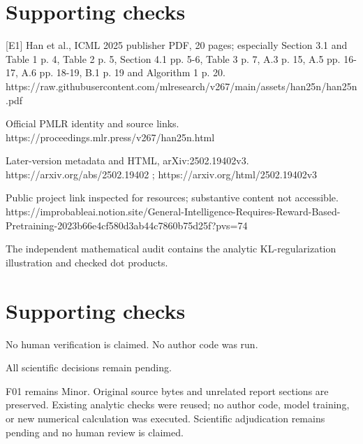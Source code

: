 \documentclass[10pt]{article}
\begin{document}
\section*{Supporting checks}
[E1] Han et al., ICML 2025 publisher PDF, 20 pages; especially Section 3.1 and Table 1 p. 4, Table 2 p. 5, Section 4.1 pp. 5-6, Table 3 p. 7, A.3 p. 15, A.5 pp. 16-17, A.6 pp. 18-19, B.1 p. 19 and Algorithm 1 p. 20. https://raw.githubusercontent.com/mlresearch/v267/main/assets/han25n/han25n.pdf\par
[E2] Official PMLR identity and source links. https://proceedings.mlr.press/v267/han25n.html\par
[E3] Later-version metadata and HTML, arXiv:2502.19402v3. https://arxiv.org/abs/2502.19402 ; https://arxiv.org/html/2502.19402v3\par
[E4] Public project link inspected for resources; substantive content not accessible. https://improbableai.notion.site/General-Intelligence-Requires-Reward-Based-Pretraining-2023b66e4cf580d3ab44c7860b75d25f?pvs=74\par
The independent mathematical audit contains the analytic KL-regularization illustration and checked dot products.\par
\section*{Supporting checks}
No human verification is claimed. No author code was run.\par
All scientific decisions remain pending.\par
F01 remains Minor. Original source bytes and unrelated report sections are preserved. Existing analytic checks were reused; no author code, model training, or new numerical calculation was executed. Scientific adjudication remains pending and no human review is claimed.\par
\end{document}
